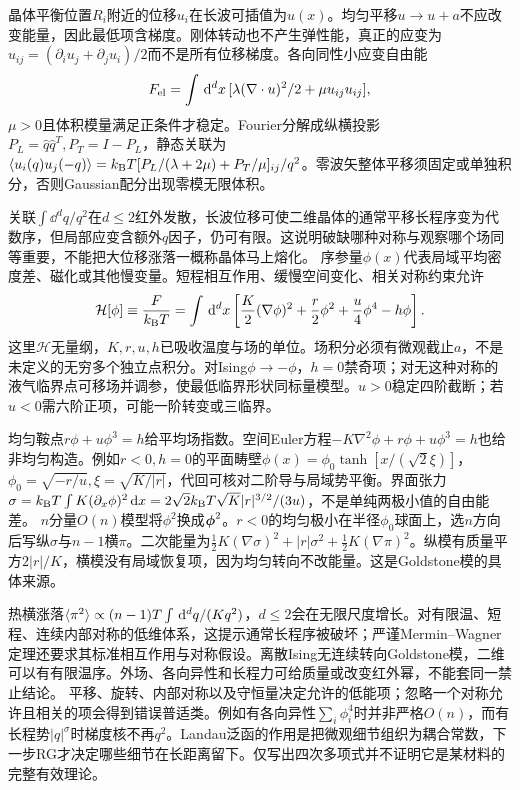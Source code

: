\label{ch:landau}
晶体平衡位置$R_i$附近的位移$u_i$在长波可插值为$u(x)$。均匀平移$u\to u+a$不应改变能量，因此最低项含梯度。刚体转动也不产生弹性能，真正的应变为$u_{ij}=(\partial_iu_j+\partial_ju_i)/2$而不是所有位移梯度。各向同性小应变自由能
\begin{equation}
F_{\rm el}=\int\,\mathrm d^dx\,[\lambda(\nabla\cdot u)^2/2+\mu u_{ij}u_{ij}],
\end{equation}
$\mu>0$且体积模量满足正条件才稳定。Fourier分解成纵横投影$P_L=\hat q\hat q^T,P_T=I-P_L$，静态关联为$\langle u_i(q)u_j(-q)\rangle=k_{\mathrm B} T[P_L/(\lambda+2\mu)+P_T/\mu]_{ij}/q^2$。零波矢整体平移须固定或单独积分，否则Gaussian配分出现零模无限体积。

关联$\int\dd^dq/q^2$在$d\le2$红外发散，长波位移可使二维晶体的通常平移长程序变为代数序，但局部应变含额外$q$因子，仍可有限。这说明破缺哪种对称与观察哪个场同等重要，不能把大位移涨落一概称晶体马上熔化。
序参量$\phi(x)$代表局域平均密度差、磁化或其他慢变量。短程相互作用、缓慢空间变化、相关对称约束允许
\begin{equation}
\mathcal H[\phi]\equiv\frac F{k_{\mathrm B} T}=\int\,\mathrm d^dx\left[\frac K2(\nabla\phi)^2+\frac r2\phi^2+\frac u4\phi^4-h\phi\right].
\end{equation}
这里$\mathcal H$无量纲，$K,r,u,h$已吸收温度与场的单位。场积分必须有微观截止$a$，不是未定义的无穷多个独立点积分。对Ising$\phi\to-\phi$，$h=0$禁奇项；对无这种对称的液气临界点可移场并调参，使最低临界形状同标量模型。$u>0$稳定四阶截断；若$u<0$需六阶正项，可能一阶转变或三临界。

均匀鞍点$r\phi+u\phi^3=h$给平均场指数。空间Euler方程$-K\nabla^2\phi+r\phi+u\phi^3=h$也给非均匀构造。例如$r<0,h=0$的平面畴壁$\phi(x)=\phi_0\tanh[x/(\sqrt2\xi)]$，$\phi_0=\sqrt{-r/u},\xi=\sqrt{K/|r|}$，代回可核对二阶导与局域势平衡。界面张力$\sigma=k_{\mathrm B} T\int K(\partial_x\phi)^2\,\mathrm d x=2\sqrt2k_{\mathrm B} T\sqrt K|r|^{3/2}/(3u)$，不是单纯两极小值的自由能差。
$n$分量$O(n)$模型将$\phi^2$换成$\boldsymbol{\phi}^2$。$r<0$的均匀极小在半径$\phi_0$球面上，选$n$方向后写纵$\sigma$与$n-1$横$\pi$。二次能量为$\frac12K(\nabla\sigma)^2+|r|\sigma^2+\frac12K(\nabla\pi)^2$。纵模有质量平方$2|r|/K$，横模没有局域恢复项，因为均匀转向不改能量。这是Goldstone模的具体来源。

热横涨落$\langle \pi^2\rangle\propto(n-1)T\int\,\mathrm d^dq/(Kq^2)$，$d\le2$会在无限尺度增长。对有限温、短程、连续内部对称的低维体系，这提示通常长程序被破坏；严谨Mermin--Wagner定理还要求其标准相互作用与对称假设。离散Ising无连续转向Goldstone模，二维可以有有限温序。外场、各向异性和长程力可给质量或改变红外幂，不能套同一禁止结论。
平移、旋转、内部对称以及守恒量决定允许的低能项；忽略一个对称允许且相关的项会得到错误普适类。例如有各向异性$\sum_i\phi_i^4$时并非严格$O(n)$，而有长程势$|q|^\sigma$时梯度核不再$q^2$。Landau泛函的作用是把微观细节组织为耦合常数，下一步RG才决定哪些细节在长距离留下。仅写出四次多项式并不证明它是某材料的完整有效理论。
